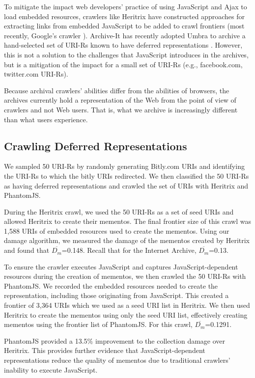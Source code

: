 To mitigate the impact web developers' practice of using JavaScript and Ajax to load embedded resources, crawlers like Heritrix have constructed approaches for extracting links from embedded JavaScript to be added to crawl frontiers  \cite{htrixJS} (most recently, Google's crawler \cite{googleJS}). Archive-It has recently adopted Umbra to archive a hand-selected set of URI-Rs known to have deferred representations \cite{umbra}. However, this is not a solution to the challenges that JavaScript introduces in the archives, but is a mitigation of the impact for a small set of URI-Rs (e.g., facebook.com, twitter.com URI-Rs).

Because archival crawlers' abilities differ from the abilities of browsers, the archives currently hold a representation of the Web from the point of view of crawlers and not Web users. That is, what we archive is increasingly different than what users experience.

\subsection{Crawling Deferred Representations}
\label{crawlDeferred}
We sampled 50 URI-Rs by randomly generating Bitly.com URIs and identifying the URI-Rs to which the bitly URIs redirected. We then classified the 50 URI-Rs as having deferred representations and crawled the set of URIs with Heritrix and PhantomJS. 

During the Heritrix crawl, we used the 50 URI-Rs as a set of seed URIs and allowed Heritrix to create their mementos. The final frontier size of this crawl was 1,588 URIs of embedded resources used to create the mementos. Using our damage algorithm, we measured the damage of the mementos created by Heritrix and found that $\overline{D_m}$=0.148. Recall that for the Internet Archive, $\overline{D_m}$=0.13.

To ensure the crawler executes JavaScript and captures JavaScript-dependent resources during the creation of mementos, we then crawled the 50 URI-Rs with PhantomJS. We recorded the embedded resources needed to create the representation, including those originating from JavaScript. This created a frontier of 3,364 URIs which we used as a seed URI list in Heritrix. We then used Heritrix to create the mementos using only the seed URI list, effectively creating mementos using the frontier list of PhantomJS. For this crawl, $\overline{D_m}$=0.1291. 

PhantomJS provided a 13.5\% improvement to the collection damage over Heritrix. This provides further evidence that JavaScript-dependent representations reduce the quality of mementos due to traditional crawlers' inability to execute JavaScript.

